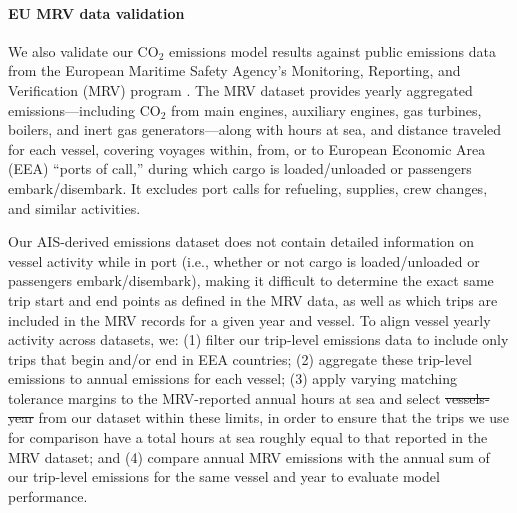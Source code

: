 \documentclass[lineno,pdflatex,sn-nature]{sn-jnl}
\makeatletter
\providecommand{\DIFadd}[1]{{\protect\color{blue}\uwave{#1}}} %
\providecommand{\DIFdel}[1]{{\protect\color{red}\sout{#1}}} %
\providecommand{\DIFaddbegin}{} %
\providecommand{\DIFaddend}{} %
\providecommand{\DIFdelbegin}{} %
\providecommand{\DIFdelend}{} %
\providecommand{\DIFscaledelfig}{0.5}
\newlength{\DIFdelgraphicswidth} %
\newlength{\DIFdelgraphicsheight} %
\providecommand{\DIFaddincludegraphics}[2][]{{\color{blue}\fbox{\DIFOincludegraphics[#1]{#2}}}} %
\providecommand{\DIFdelincludegraphics}[2][]{%
\sbox{\DIFdelgraphicsbox}{\DIFOincludegraphics[#1]{#2}}%
\settoboxwidth{\DIFdelgraphicswidth}{\DIFdelgraphicsbox} %
\settoboxtotalheight{\DIFdelgraphicsheight}{\DIFdelgraphicsbox} %
\scalebox{\DIFscaledelfig}{%
\parbox[b]{\DIFdelgraphicswidth}{\usebox{\DIFdelgraphicsbox}\\[-\baselineskip] \rule{\DIFdelgraphicswidth}{0em}}\llap{\resizebox{\DIFdelgraphicswidth}{\DIFdelgraphicsheight}{%
\setlength{\unitlength}{\DIFdelgraphicswidth}%
\begin{picture}(1,1)%
\thicklines\linethickness{2pt} %
{\color[rgb]{1,0,0}\put(0,0){\framebox(1,1){}}}%
{\color[rgb]{1,0,0}\put(0,0){\line( 1,1){1}}}%
{\color[rgb]{1,0,0}\put(0,1){\line(1,-1){1}}}%
\end{picture}%
}\hspace*{3pt}}} %
} %
\DeclareRobustCommand{\DIFaddbegin}{\DIFOaddbegin \let\includegraphics\DIFaddincludegraphics} %
\DeclareRobustCommand{\DIFaddend}{\DIFOaddend \let\includegraphics\DIFOincludegraphics} %
\DeclareRobustCommand{\DIFdelbegin}{\DIFOdelbegin \let\includegraphics\DIFdelincludegraphics} %
\DeclareRobustCommand{\DIFdelend}{\DIFOaddend \let\includegraphics\DIFOincludegraphics} %
\let\sout@orig\sout %
\renewcommand{\sout}[1]{\ifmmode\text{\sout@orig{\ensuremath{#1}}}\else\sout@orig{#1}\fi} %
\makeatother
\begin{document}
\paragraph{EU MRV data validation}

We also validate our CO$_{2}$ emissions model results against public emissions data from the European Maritime Safety Agency’s Monitoring, Reporting, and Verification (MRV) program  \cite{mrv_emissions}. The MRV dataset provides yearly aggregated emissions—including CO$_{2}$ from main engines, auxiliary engines, gas turbines, boilers, and inert gas generators—along with hours at sea, and distance traveled for each vessel, covering voyages within, from, or to European Economic Area (EEA) “ports of call,” during which cargo is loaded/unloaded or passengers embark/disembark. It excludes port calls for refueling, supplies, crew changes, and similar activities.

Our AIS-derived emissions dataset does not contain detailed information on vessel activity while in port (i.e., whether or not cargo is loaded/unloaded or passengers embark/disembark), making it difficult to determine the exact same trip start and end points as defined in the MRV data, as well as which trips are included in the MRV records for a given year and vessel. To align vessel yearly activity across datasets, we: (1) filter our trip-level emissions data to include only trips that begin and/or end in EEA countries; (2) aggregate these trip-level emissions to annual emissions for each vessel; (3) apply varying matching tolerance margins to the MRV-reported annual hours at sea and select \DIFdelbegin \DIFdel{vessels-year }\DIFdelend \DIFaddbegin \DIFadd{vessel-years }\DIFaddend from our dataset within these limits, in order to ensure that the trips we use for comparison have a total hours at sea roughly equal to that reported in the MRV dataset; and (4) compare annual MRV emissions with the annual sum of our trip-level emissions for the same vessel and year to evaluate model performance.
\end{document}

